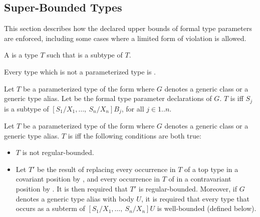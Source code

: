\documentclass[makeidx]{article}
\begin{document}
\subsection{Super-Bounded Types}

\LMHash{}%
This section describes how
the declared upper bounds of formal type parameters are enforced,
including some cases where a limited form of violation is allowed.

\LMHash{}%
A  is a type $T$ such that  is a subtype of $T$.


\LMHash{}%
Every type which is not a parameterized type is .


\LMHash{}%
Let $T$ be a parameterized type of the form
where $G$ denotes a generic class or a generic type alias.
Let
be the formal type parameter declarations of $G$.
$T$ is  if{}f
$S_j$ is a subtype of
$[S_1/X_1, \ldots,\ S_n/X_n]B_j$,
for all $j \in 1 .. n$.


\LMHash{}%
Let $T$ be a parameterized type of the form
where $G$ denotes a generic class or a generic type alias.
$T$ is  if{}f the following conditions are both true:

\begin{itemize}
\item
  $T$ is not regular-bounded.
\item
  Let $T'$ be the result of replacing every occurrence in $T$
  of a top type in a covariant position by ,
  and every occurrence in $T$
  of  in a contravariant position by .
  It is then required that $T'$ is regular-bounded.
  Moreover, if $G$ denotes a generic type alias with body $U$,
  it is required that every type that occurs as a subterm of
  $[S_1/X_1, \ldots,\ S_n/X_n]U$
  is well-bounded (defined below).
\end{itemize}
\end{document}
